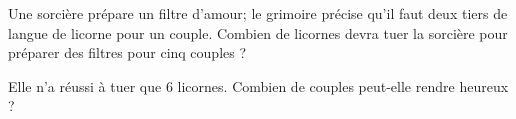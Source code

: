 
\begin{exercice}\label{exo2smath-0031}

    Une sorcière prépare un filtre d'amour; le grimoire précise qu'il faut deux tiers de langue de licorne pour un couple. Combien de licornes devra tuer la sorcière pour préparer des filtres pour cinq couples ?

    Elle n'a réussi à tuer que \( 6\) licornes. Combien de couples peut-elle rendre heureux ?

\end{exercice}
